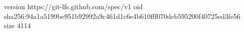 version https://git-lfs.github.com/spec/v1
oid sha256:94a1a5199be951b92992a9c461d1c6e4b610fff070deb595200f40725ed3fe56
size 4114
